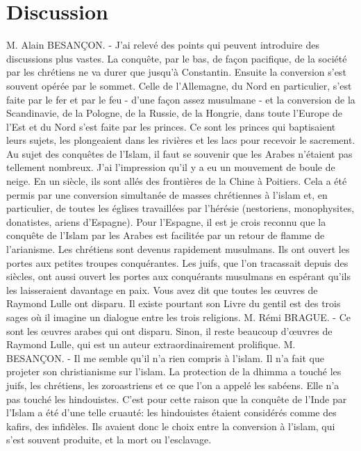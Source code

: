 \section{Discussion}
\newline M. Alain BESANÇON. - J'ai relevé des points qui peuvent introduire des discussions plus vastes. La conquête, par le bas, de façon pacifique, de la société par les chrétiens ne va durer que jusqu'à Constantin. Ensuite la conversion s'est souvent opérée par le sommet. Celle de l'Allemagne, du Nord en particulier, s'est faite par le fer et par le feu - d'une façon assez musulmane - et la conversion de la Scandinavie, de la Pologne, de la Russie, de la Hongrie, dans toute l'Europe de l'Est et du Nord s'est faite par les princes. Ce sont les princes qui baptisaient leurs sujets, les plongeaient dans les rivières et les lacs pour recevoir le sacrement. Au sujet des conquêtes de l'Islam, il faut se souvenir que les Arabes n'étaient pas tellement nombreux. J'ai l'impression qu'il y a eu un mouvement de boule de neige. En un siècle, ils sont allés des frontières de la Chine à Poitiers. Cela a été permis par une conversion simultanée de masses chrétiennes à l'islam et, en particulier, de toutes les églises travaillées par l'hérésie (nestoriens, monophysites, donatistes, ariens d'Espagne). Pour l'Espagne, il est je crois reconnu que la conquête de l'Islam par les Arabes est facilitée par un retour de flamme de l'arianisme. Les chrétiens sont devenus rapidement musulmans. Ils ont ouvert les portes aux petites troupes conquérantes. Les juifs, que l'on tracassait depuis des siècles, ont aussi ouvert les portes aux conquérants musulmans en espérant qu'ils les laisseraient davantage en paix.
Vous avez dit que toutes les œuvres de Raymond Lulle ont disparu. Il existe pourtant son Livre du gentil est des trois sages où il imagine un dialogue entre les trois religions.
\newline M. Rémi BRAGUE. - Ce sont les œuvres arabes qui ont disparu. Sinon, il reste beaucoup d'œuvres de Raymond Lulle, qui est un auteur extraordinairement prolifique.
\newline M. BESANÇON. - Il me semble qu'il n'a rien compris à l'islam. Il n'a fait que projeter son christianisme sur l'islam.
La protection de la dhimma a touché les juifs, les chrétiens, les zoroastriens et ce que l'on a appelé les sabéens. Elle n'a pas touché les hindouistes. C'est pour cette raison que la conquête de l'Inde par l'Islam a été d'une telle cruauté: les hindouistes étaient considérés comme des kafirs, des infidèles. Ils avaient donc le choix entre la conversion à l'islam, qui s'est souvent produite, et la mort ou l'esclavage.
